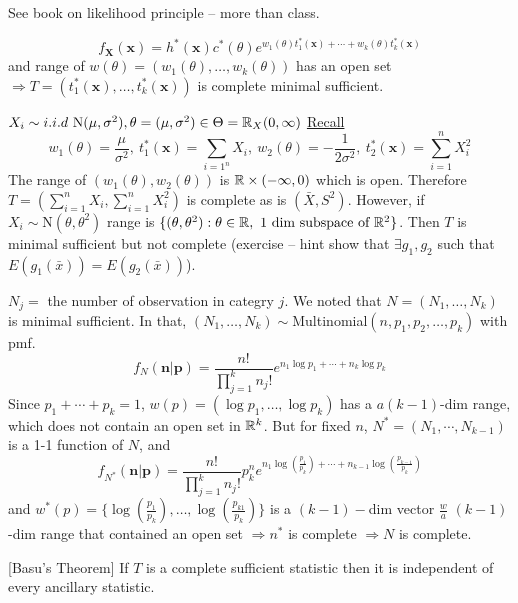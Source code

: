 \documentclass[english, 11pt]{article}
\begin{document}
\begin{note}
See book on likelihood principle -- more than class.
\end{note}

$$
f_{\bm{X}}(\bm{x})=h^*(\bm{x})c^*(\theta)e^{w_1(\theta)t_1^*(\bm{x})+\cdots+w_k(\theta)t_k^*(\bm{x})}
$$
and range of $w(\theta)=(w_1(\theta), \dots, w_k(\theta))$ has an open set $\Rightarrow T=(t_1^*(\bm{x}),\dots, t_k^*(\bm{x}))$ is complete minimal sufficient.

\begin{exmp}
$X_i\sim i.i.d~\text{N}(\mu, \sigma^2), \theta=(\mu, \sigma^2)\in \Theta={\mathbb{R}}_X(0, \infty)$
\underline{Recall}
$$
w_1(\theta)=\frac{\mu}{\sigma^2}, \ t^*_1(\bm{x})=\sum_{i=1^n}X_i,\  w_2(\theta)=-\frac{1}{2\sigma^2}, \ t_2^*(\bm{x})=\sum_{i=1}^nX_i^2
$$
The range of $(w_1(\theta), w_2(\theta))$ is ${\mathbb{R}}\times(-\infty, 0)$ which is open. Therefore $T=\left(\sum_{i=1}^nX_i, \sum_{i=1}^nX_i^2\right)$ is complete as is $(\bar{X}, S^2)$. However, if $X_i\sim\text{N}(\theta,\theta^2)$ range is $\{(\theta, \theta^2):\theta\in {\mathbb{R}},\text{ 1 dim subspace of }{\mathbb{R}}^2\}$. Then $T$ is minimal sufficient but not complete (exercise -- hint show that $\exists g_1, g_2$ such that $E(g_1(\bar{x}))=E(g_2(\bar{x}))$).
\end{exmp}

\begin{exmp}
$N_j=$ the number of observation in categry $j$. We noted that $N=(N_1, \dots, N_k)$ is minimal sufficient. In that, $(N_1, \dots, N_k)\sim $Multinomial$(n, p_1, p_2, \dots, p_k)$ with pmf.
$$
f_N(\bm{n}|\bm{p})=\frac{n!}{\prod_{j=1}^k n_j!}e^{n_1\log p_1+\cdots+n_k\log p_k}
$$
Since $p_1+\cdots+p_k=1$, $w(p)=(\log p_1, \dots, \log p_k)$ has a $a(k-1)$-dim range, which does not contain an open set in ${\mathbb{R}}^k$. But for fixed $n$, $N^*=(N_1, \cdots, N_{k-1})$ is a 1-1 function of $N$, and 
$$
f_{N^*}(\bm{n}|\bm{p})=\frac{n!}{\prod_{j=1}^k n_j!}p_k^ne^{n_1\log\left(\frac{p_1}{p_k}\right)+\cdots+n_{k-1}\log\left(\frac{p_{k-1}}{p_k}\right)}
$$
and  $w^*(p)=\{\log\left(\frac{p_1}{p_k}\right), \dots, \log\left(\frac{p_{k1}}{p_k}\right)\}$ is a $(k-1)-$dim vector $\frac{w}{a}$ $(k-1)$-dim range that contained an open set $\Rightarrow n^*$ is complete $\Rightarrow N$ is complete. 
\end{exmp}

\begin{thrm}\label{thrm:223}[Basu's Theorem]
If $T$ is a complete sufficient statistic then it is independent of every ancillary statistic.
\end{thrm}
\end{document}
